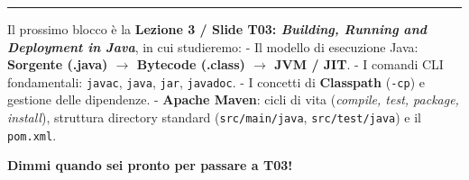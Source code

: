 \documentclass[11pt,a4paper]{article}
\newcommand{\passthrough}[1]{#1}
\begin{document}
\begin{center}\rule{0.5\linewidth}{0.5pt}\end{center}

\begin{studynote} Il prossimo blocco è la \textbf{Lezione 3 / Slide T03:
\emph{Building, Running and Deployment in Java}}, in cui studieremo: -
Il modello di esecuzione Java: \textbf{Sorgente (.java) \(\rightarrow\)
Bytecode (.class) \(\rightarrow\) JVM / JIT}. - I comandi CLI
fondamentali: \passthrough{\lstinline!javac!},
\passthrough{\lstinline!java!}, \passthrough{\lstinline!jar!},
\passthrough{\lstinline!javadoc!}. - I concetti di \textbf{Classpath}
(\passthrough{\lstinline!-cp!}) e gestione delle dipendenze. -
\textbf{Apache Maven}: cicli di vita (\emph{compile, test, package,
install}), struttura directory standard
(\passthrough{\lstinline!src/main/java!},
\passthrough{\lstinline!src/test/java!}) e il
\passthrough{\lstinline!pom.xml!}.
\end{studynote}

\textbf{Dimmi quando sei pronto per passare a T03!}
\end{document}
